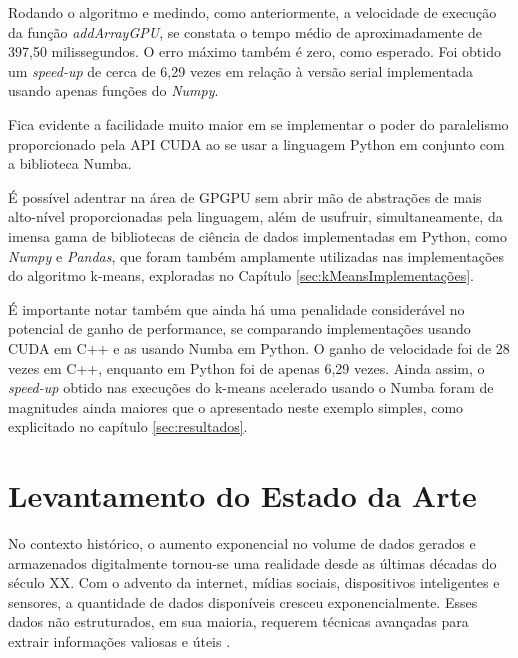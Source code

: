\documentclass[12pt,
openright, 
oneside, %
a4paper,    %
brazil]{facom-ufu-abntex2}
\begin{document}
Rodando o algoritmo e medindo, como anteriormente, a velocidade de execução da função \textit{addArrayGPU}, se constata o tempo médio de aproximadamente de 397,50 milissegundos. O erro máximo também é zero, como esperado. Foi obtido um \textit{speed-up} de cerca de 6,29 vezes em relação à versão serial implementada usando apenas funções do \textit{Numpy}.

Fica evidente a facilidade muito maior em se implementar o poder do paralelismo proporcionado pela API CUDA ao se usar a linguagem Python em conjunto com a biblioteca Numba.

É possível adentrar na área de GPGPU sem abrir mão de abstrações de mais alto-nível proporcionadas pela linguagem, além de usufruir, simultaneamente, da imensa gama de bibliotecas de ciência de dados implementadas em Python, como \textit{Numpy} e \textit{Pandas}, que foram também amplamente utilizadas nas implementações do algoritmo k-means, exploradas no Capítulo \ref{sec:kMeansImplementações}.

É importante notar também que ainda há uma penalidade considerável no potencial de ganho de performance, se comparando implementações usando CUDA em C++ e as usando Numba em Python. O ganho de velocidade foi de 28 vezes em C++, enquanto em Python foi de apenas 6,29 vezes. Ainda assim, o \textit{speed-up} obtido nas execuções do k-means acelerado usando o Numba foram de magnitudes ainda maiores que o apresentado neste exemplo simples, como explicitado no capítulo \ref{sec:resultados}.





\chapter{Levantamento do Estado da Arte}
\label{chp:levantamentoEstadoDaArte}

No contexto histórico, o aumento exponencial no volume de dados gerados e armazenados digitalmente tornou-se uma realidade desde as últimas décadas do século XX. Com o advento da internet, mídias sociais, dispositivos inteligentes e sensores, a quantidade de dados disponíveis cresceu exponencialmente. Esses dados não estruturados, em sua maioria, requerem técnicas avançadas para extrair informações valiosas e úteis \cite{dataMining2012-preface}.
\end{document}
